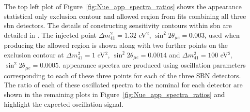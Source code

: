 \newpage
The top left plot of Figure~\ref{fig:Nue_app_spectra_ratios} shows the \nue appearance statistical only exclusion contour and allowed region from fits combining all three \gls{sbn} detectors. The details of constructing sensitivity contours within \gls{sbn} are detailed in . The injected point $\Delta m^2_{41} = 1.32$ eV$^2$, $\sin^2{2\theta_{\mu e}} = 0.003$, used when producing the allowed region is shown along with two further points on the exclusion contour at $\Delta m^2_{41} = 1$ eV$^2$, $\sin^2{2\theta_{\mu e}} = 0.0014$ and $\Delta m^2_{41} = 100$ eV$^2$, $\sin^2{2\theta_{\mu e}} = 0.0005$. \nue appearance spectra are produced using oscillation parameters corresponding to each of these three points for each of the three SBN detectors. The ratio of each of these oscillated spectra to the nominal for each detector are shown in the remaining plots in Figure~\ref{fig:Nue_app_spectra_ratios} and highlight the expected oscillation signal.


